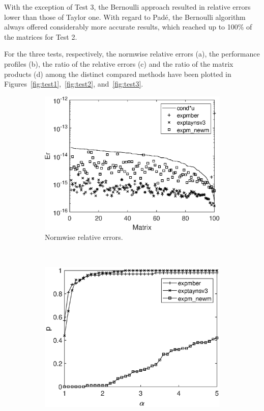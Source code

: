 \documentclass[preprint,10pt,numbers,sort&compress]{elsarticle}
\begin{document}
With the exception of Test 3, the Bernoulli approach resulted in relative errors lower than those of Taylor one. With regard to Pad\'e, the Bernoulli algorithm always offered considerably more accurate results, which reached up to 100\% of the matrices for Test 2.

For the three tests, respectively, the normwise relative errors (a), the performance profiles (b), the ratio of the relative errors (c) and the ratio of the matrix products (d) among the distinct compared methods have been plotted in Figures~\ref{fig:test1},~\ref{fig:test2}, and~\ref{fig:test3}.

\begin{figure}[t]
\centering
\begin{subfigure}[b]{0.48\textwidth}
\includegraphics[scale=0.44]{normwise_exp_diag_hadamard_complex_n128_nd256_expmber.eps}
\caption{\footnotesize Normwise relative errors.} \label{fig:test1_a} \vspace{12pt}
\end{subfigure} \ \
\begin{subfigure}[b]{0.48\textwidth}
\includegraphics[scale=0.44]{nprofile_exp_diag_hadamard_complex_n128_nd256_expmber.eps}

\end{subfigure}
\end{figure}
\end{document}
